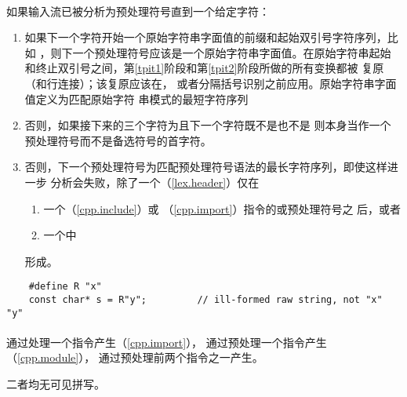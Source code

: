 \paragraph{} %
如果输入流已被分析为预处理符号直到一个给定字符：
\begin{enumerate}
  \item 如果下一个字符开始一个原始字符串字面值的前缀和起始双引号字符序列，比如
        ，则下一个预处理符号应该是一个原始字符串字面值。在原始字符串起始
        和终止双引号之间，第\ref{tpit1}阶段和第\ref{tpit2}阶段所做的所有变换都被
        复原（和行连接）；该复原应该在，
        或者分隔括号识别之前应用。原始字符串字面值定义为匹配原始字符
        串模式的最短字符序列\par
        \mbox{}
  \item 否则，如果接下来的三个字符为\tm{<::}且下一个字符既不是\tm{:}也不是\tm{<}
        则\tm{<}本身当作一个预处理符号而不是备选符号\tm{<:}的首字符。
  \item 否则，下一个预处理符号为匹配预处理符号语法的最长字符序列，即使这样进一步
        分析会失败，除了一个（\ref{lex.header}）仅在
        \begin{enumerate}
          \item 一个（\ref{cpp.include}）或
                （\ref{cpp.import}）指令的或预处理符号之
                后，或者
          \item 一个中
        \end{enumerate}
        形成。
\end{enumerate}

\begin{example} %
  \begin{lstlisting}
    #define R "x"
    const char* s = R"y";         // ill-formed raw string, not "x" "y"
  \end{lstlisting}
\end{example}

\paragraph{} %
通过处理一个指令产生（\ref{cpp.import}），
通过预处理一个指令产生（\ref{cpp.module}），
通过预处理前两个指令之一产生。

\begin{note} %
  二者均无可见拼写。
\end{note}

